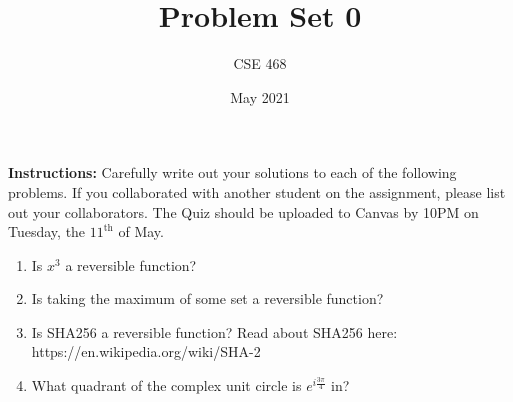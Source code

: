 \documentclass[12pt]{article}
\title{Problem Set 0}
\author{CSE 468}
\date{May 2021}
\begin{document}
\maketitle

\noindent \textbf{Instructions:} Carefully write out your solutions to each of the following problems. If you collaborated with another student on the assignment, please list out your collaborators. The Quiz should be uploaded to Canvas by 10PM on Tuesday, the $11^{\text{th}}$ of May. \\

\begin{enumerate}[font=\bfseries]
    \item Is $x^3$ a reversible function?
    \item Is taking the maximum of some set a reversible function?
    \item Is SHA256 a reversible function? Read about SHA256 here: https://en.wikipedia.org/wiki/SHA-2
    \item What quadrant of the complex unit circle is $e^{i\frac{3\pi}{4}}$ in?
    
\end{enumerate}
\end{document}
